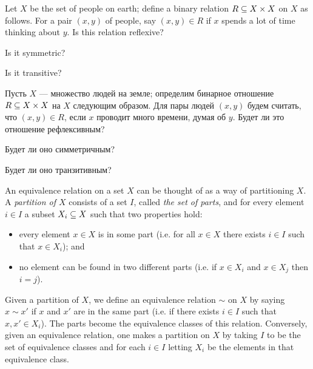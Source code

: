 \documentclass[CT4S-EN-RU]{subfiles}
\begin{document}
\begin{exerciseENG}
Let $X$ be the set of people on earth; define a binary relation $R\ss X\times X$ on $X$ as follows. For a pair $(x,y)$ of people, say $(x,y)\in R$ if $x$ spends a lot of time thinking about $y$. 
\sexc Is this relation reflexive? 
\item Is it symmetric? 
\item Is it transitive?
\endsexc
\end{exerciseENG}

\begin{exerciseRUS}
Пусть $X$ — множество людей на земле; определим бинарное отношение $R\ss X\times X$ на $X$ следующим образом. Для пары людей $(x,y)$ будем считать, что $(x,y)\in R$, если $x$ проводит много времени, думая об $y$. 
\sexc Будет ли это отношение рефлексивным? 
\item Будет ли оно симметричным? 
\item Будет ли оно транзитивным?
\endsexc
\end{exerciseRUS}

\begin{exampleENG}[Partitions]\label{ex:partition}
An equivalence relation on a set $X$ can be thought of as a way of partitioning $X$. A {\em partition of $X$} consists of a set $I$, called {\em the set of parts}, and for every element $i\in I$ a subset $X_i\ss X$ such that two properties hold:
\begin{itemize}
\item every element $x\in X$ is in some part (i.e. for all $x\in X$ there exists $i\in I$ such that $x\in X_i$); and
\item no element can be found in two different parts (i.e. if $x\in X_i$ and $x\in X_j$ then $i=j$).
\end{itemize}

Given a partition of $X$, we define an equivalence relation $\sim$ on $X$ by saying $x\sim x'$ if $x$ and $x'$ are in the same part (i.e. if there exists $i\in I$ such that $x,x'\in X_i$). The parts become the equivalence classes of this relation. Conversely, given an equivalence relation, one makes a partition on $X$ by taking $I$ to be the set of equivalence classes and for each $i\in I$ letting $X_i$ be the elements in that equivalence class.
\end{exampleENG}
\end{document}
